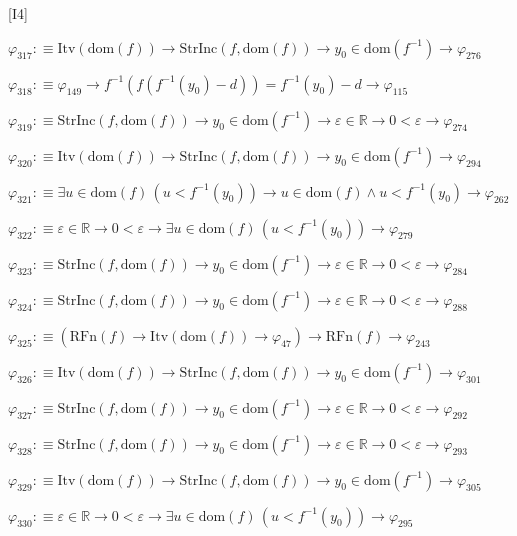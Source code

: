 \begin{fullproof}{[I4]}
\begin{abbrevlist}
\item $\varphi_{317} :\equiv \mathrm{Itv}(\mathrm{dom}(f)) \to \mathrm{StrInc}(f,\mathrm{dom}(f)) \to y_{0} \in \mathrm{dom}(f^{-1}) \to \varphi_{276}$
\item $\varphi_{318} :\equiv \varphi_{149} \to f^{-1}(f(f^{-1}(y_{0}) - d)) = f^{-1}(y_{0}) - d \to \varphi_{115}$
\item $\varphi_{319} :\equiv \mathrm{StrInc}(f,\mathrm{dom}(f)) \to y_{0} \in \mathrm{dom}(f^{-1}) \to \varepsilon \in \mathbb{R} \to 0 < \varepsilon \to \varphi_{274}$
\item $\varphi_{320} :\equiv \mathrm{Itv}(\mathrm{dom}(f)) \to \mathrm{StrInc}(f,\mathrm{dom}(f)) \to y_{0} \in \mathrm{dom}(f^{-1}) \to \varphi_{294}$
\item $\varphi_{321} :\equiv \exists u \in \mathrm{dom}(f)\,(u < f^{-1}(y_{0})) \to u \in \mathrm{dom}(f) \land u < f^{-1}(y_{0}) \to \varphi_{262}$
\item $\varphi_{322} :\equiv \varepsilon \in \mathbb{R} \to 0 < \varepsilon \to \exists u \in \mathrm{dom}(f)\,(u < f^{-1}(y_{0})) \to \varphi_{279}$
\item $\varphi_{323} :\equiv \mathrm{StrInc}(f,\mathrm{dom}(f)) \to y_{0} \in \mathrm{dom}(f^{-1}) \to \varepsilon \in \mathbb{R} \to 0 < \varepsilon \to \varphi_{284}$
\item $\varphi_{324} :\equiv \mathrm{StrInc}(f,\mathrm{dom}(f)) \to y_{0} \in \mathrm{dom}(f^{-1}) \to \varepsilon \in \mathbb{R} \to 0 < \varepsilon \to \varphi_{288}$
\item $\varphi_{325} :\equiv (\mathrm{RFn}(f) \to \mathrm{Itv}(\mathrm{dom}(f)) \to \varphi_{47}) \to \mathrm{RFn}(f) \to \varphi_{243}$
\item $\varphi_{326} :\equiv \mathrm{Itv}(\mathrm{dom}(f)) \to \mathrm{StrInc}(f,\mathrm{dom}(f)) \to y_{0} \in \mathrm{dom}(f^{-1}) \to \varphi_{301}$
\item $\varphi_{327} :\equiv \mathrm{StrInc}(f,\mathrm{dom}(f)) \to y_{0} \in \mathrm{dom}(f^{-1}) \to \varepsilon \in \mathbb{R} \to 0 < \varepsilon \to \varphi_{292}$
\item $\varphi_{328} :\equiv \mathrm{StrInc}(f,\mathrm{dom}(f)) \to y_{0} \in \mathrm{dom}(f^{-1}) \to \varepsilon \in \mathbb{R} \to 0 < \varepsilon \to \varphi_{293}$
\item $\varphi_{329} :\equiv \mathrm{Itv}(\mathrm{dom}(f)) \to \mathrm{StrInc}(f,\mathrm{dom}(f)) \to y_{0} \in \mathrm{dom}(f^{-1}) \to \varphi_{305}$
\item $\varphi_{330} :\equiv \varepsilon \in \mathbb{R} \to 0 < \varepsilon \to \exists u \in \mathrm{dom}(f)\,(u < f^{-1}(y_{0})) \to \varphi_{295}$

\end{abbrevlist}
\end{fullproof}
